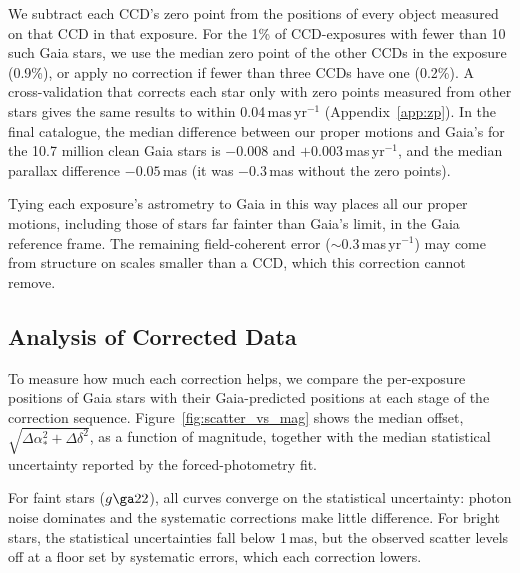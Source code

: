 \documentclass[usenatbib]{mnras}   %
\begin{document}
We subtract each CCD's zero point from the positions of every object measured on that CCD in that exposure. For the 1\% of CCD-exposures with fewer than 10 such Gaia stars, we use the median zero point of the other CCDs in the exposure (0.9\%), or apply no correction if fewer than three CCDs have one (0.2\%). A cross-validation that corrects each star only with zero points measured from other stars gives the same results to within 0.04\,mas\,yr$^{-1}$ (Appendix~\ref{app:zp}). In the final catalogue, the median difference between our proper motions and Gaia's for the 10.7 million clean Gaia stars is $-0.008$ and $+0.003$\,mas\,yr$^{-1}$, and the median parallax difference $-0.05$\,mas (it was $-0.3$\,mas without the zero points).

Tying each exposure's astrometry to Gaia in this way places all our proper motions, including those of stars far fainter than Gaia's limit, in the Gaia reference frame. The remaining field-coherent error ($\sim\!0.3$\,mas\,yr$^{-1}$) may come from structure on scales smaller than a CCD, which this correction cannot remove.

\subsection{Analysis of Corrected Data} \label{sec:corr_analysis}

To measure how much each correction helps, we compare the per-exposure positions of Gaia stars with their Gaia-predicted positions at each stage of the correction sequence. Figure~\ref{fig:scatter_vs_mag} shows the median offset, $\sqrt{\Delta\alpha_*^2 + \Delta\delta^2}$, as a function of magnitude, together with the median statistical uncertainty reported by the forced-photometry fit.

For faint stars ($g \ga 22$), all curves converge on the statistical uncertainty: photon noise dominates and the systematic corrections make little difference. For bright stars, the statistical uncertainties fall below 1\,mas, but the observed scatter levels off at a floor set by systematic errors, which each correction lowers.
\end{document}
